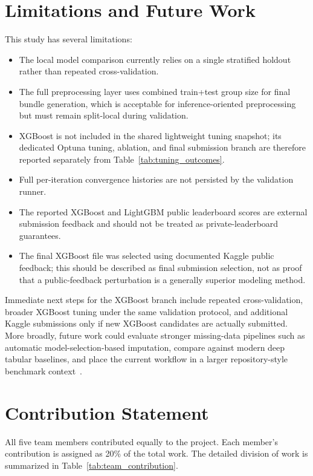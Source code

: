 \documentclass[conference]{IEEEtran}
\begin{document}
\section{Limitations and Future Work}
This study has several limitations:
\begin{itemize}
\item The local model comparison currently relies on a single stratified holdout rather than repeated cross-validation.
\item The full preprocessing layer uses combined train+test group size for final bundle generation, which is acceptable for inference-oriented preprocessing but must remain split-local during validation.
\item XGBoost is not included in the shared lightweight tuning snapshot; its dedicated Optuna tuning, ablation, and final submission branch are therefore reported separately from Table~\ref{tab:tuning_outcomes}.
\item Full per-iteration convergence histories are not persisted by the validation runner.
\item The reported XGBoost and LightGBM public leaderboard scores are external submission feedback and should not be treated as private-leaderboard guarantees.
\item The final XGBoost file was selected using documented Kaggle public feedback; this should be described as final submission selection, not as proof that a public-feedback perturbation is a generally superior modeling method.
\end{itemize}

Immediate next steps for the XGBoost branch include repeated cross-validation, broader XGBoost tuning under the same validation protocol, and additional Kaggle submissions only if new XGBoost candidates are actually submitted. More broadly, future work could evaluate stronger missing-data pipelines such as automatic model-selection-based imputation, compare against modern deep tabular baselines, and place the current workflow in a larger repository-style benchmark context~\cite{jarrett2022hyperimpute,somvanshi2024deeptabular,salinas2024tabrepo,kapoor2024reforms}.

\section{Contribution Statement}
All five team members contributed equally to the project. Each member's contribution is assigned as 20\% of the total work. The detailed division of work is summarized in Table~\ref{tab:team_contribution}.
\end{document}
